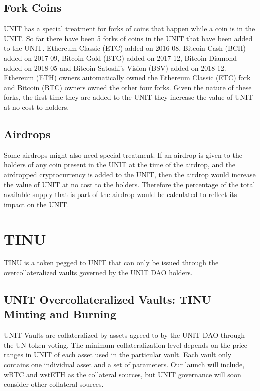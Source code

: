 \documentclass[12pt]{article}
\begin{document}
\subsection{Fork Coins}

UNIT has a special treatment for forks of coins that happen while a coin is in the UNIT. So far there have been 5 forks of coins in the UNIT that have been added to the UNIT. Ethereum Classic (ETC) added on 2016-08, Bitcoin Cash (BCH) added on 2017-09, Bitcoin Gold (BTG) added on 2017-12, Bitcoin Diamond added on 2018-05 and Bitcoin Satoshi's Vision (BSV) added on 2018-12. Ethereum (ETH) owners automatically owned the Ethereum Classic (ETC) fork and Bitcoin (BTC) owners owned the other four forks. Given the nature of these forks, the first time they are added to the UNIT they increase the value of UNIT at no cost to holders.

\subsection{Airdrops}

Some airdrops might also need special treatment. If an airdrop is given to the holders of any coin present in the UNIT at the time of the airdrop, and the airdropped cryptocurrency is added to the UNIT, then the airdrop would increase the value of UNIT at no cost to the holders. Therefore the percentage of the total available supply that is part of the airdrop would be calculated to reflect its impact on the UNIT.

\section{TINU}

TINU is a token pegged to UNIT that can only be issued through the overcollateralized vaults governed by the UNIT DAO holders.

\subsection{UNIT Overcollateralized Vaults: TINU Minting and Burning}

UNIT Vaults are collateralized by assets agreed to by the UNIT DAO through the UN token voting. The minimum collateralization level depends on the price ranges in UNIT of each asset used in the particular vault. Each vault only contains one individual asset and a set of parameters. Our launch will include, wBTC and wstETH as the collateral sources, but UNIT governance will soon consider other collateral sources.
\end{document}
